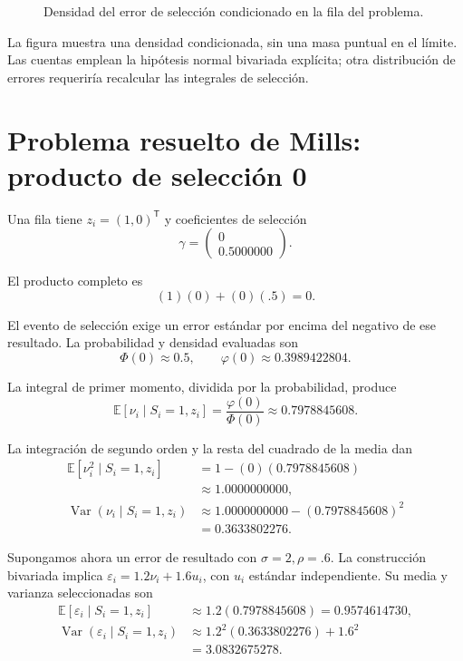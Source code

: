 \documentclass[11pt,a4paper]{article}
\newcommand{\E}{\mathbb E}
\newcommand{\T}{^{\mathsf T}}
\DeclareMathOperator{\Var}{Var}
\begin{document}
\begin{figure}[H]\centering
{}
\caption{Densidad del error de selección condicionado en la fila del problema.}
\end{figure}

La figura muestra una densidad condicionada,
sin una masa puntual en el límite.
Las cuentas emplean la hipótesis
normal bivariada explícita;
otra distribución de errores requeriría
recalcular las integrales de selección.

\clearpage
\section{Problema resuelto de Mills: producto de selección 0}\label{unidad80}
Una fila tiene \(z_i=(1,0)\T\)
y coeficientes de selección
\[
\gamma=\begin{pmatrix}0\\0.5000000\end{pmatrix}.
\]

El producto completo es
\[
(1)(0)+(0)(.5)=0.
\]

El evento de selección exige un error estándar
por encima del negativo de ese resultado.
La probabilidad y densidad evaluadas son
\[
\Phi(0)\approx0.5,\qquad\varphi(0)\approx0.3989422804.
\]

La integral de primer momento, dividida
por la probabilidad, produce
\[
\E[\nu_i\mid S_i=1,z_i]
=\frac{\varphi(0)}{\Phi(0)}
\approx0.7978845608.
\]

La integración de segundo orden y
la resta del cuadrado de la media dan
\[
\begin{aligned}
\E[\nu_i^2\mid S_i=1,z_i]&=1-(0)(0.7978845608)\\
&\approx1.0000000000,\\
\Var(\nu_i\mid S_i=1,z_i)&\approx1.0000000000-(0.7978845608)^2\\
&=0.3633802276.\end{aligned}
\]

Supongamos ahora un error de resultado con
\(\sigma=2,\rho=.6\).
La construcción bivariada implica
\(\varepsilon_i=1.2\nu_i+1.6u_i\),
con \(u_i\) estándar independiente.
Su media y varianza seleccionadas son
\[
\begin{aligned}
\E[\varepsilon_i\mid S_i=1,z_i]&\approx1.2(0.7978845608)
=0.9574614730,\\
\Var(\varepsilon_i\mid S_i=1,z_i)&\approx1.2^2(0.3633802276)+1.6^2\\
&=3.0832675278.\end{aligned}
\]
\end{document}
